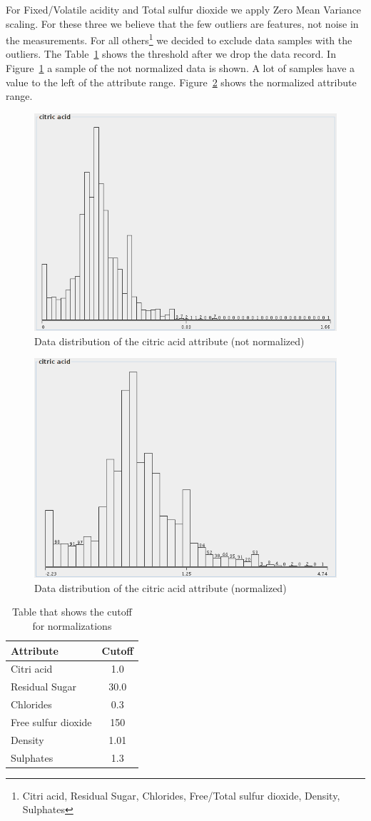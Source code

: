 \documentclass{acm_proc_article-sp}
\begin{document}
For Fixed/Volatile acidity and Total sulfur dioxide we apply Zero Mean Variance scaling. For these three we 
believe that the few outliers are features, not noise in the measurements.
For all others\footnote{Citri acid, Residual Sugar, Chlorides, Free/Total sulfur dioxide, Density, Sulphates}
we decided to exclude data samples with the outliers. The Table~\ref{tab:cutoff} shows the threshold after we drop
the data record. In Figure~\ref{fig:dist-citric-acid} a sample of the not normalized data is shown. A lot
of samples have a value to the left of the attribute range. Figure~\ref{fig:ndist-citric-acid} shows the
normalized attribute range.

\begin{figure}
\centering
\includegraphics[width=0.6\linewidth]{img/dist-citric-acid}
\caption{Data distribution of the citric acid attribute (not normalized)}
\label{fig:dist-citric-acid}
\end{figure}

\begin{figure}
\centering
\includegraphics[width=0.6\linewidth]{img/ndist-citric-acid}
\caption{Data distribution of the citric acid attribute (normalized)}
\label{fig:ndist-citric-acid}
\end{figure}

\begin{table}
\centering
\begin{tabular}{l|c}
    Attribute & Cutoff \\
    \hline
    \hline
    Citri acid & 1.0 \\
    \hline
    Residual Sugar & 30.0 \\
    \hline
    Chlorides & 0.3 \\
    \hline
    Free sulfur dioxide & 150 \\
    \hline
    Density & 1.01 \\
    \hline
    Sulphates & 1.3 \\
\end{tabular}
\caption{Table that shows the cutoff for normalizations}
\label{tab:cutoff}
\end{table}
\end{document}

